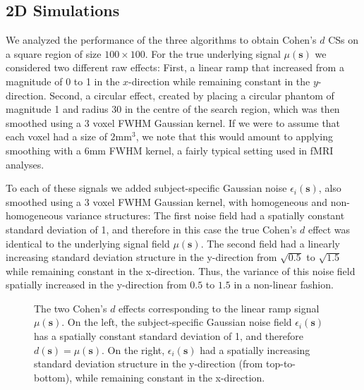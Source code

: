 \subsection{2D Simulations}
\label{sec:cohen_2D_simulations}
We analyzed the performance of the three algorithms to obtain Cohen's $d$ CSs on a square region of size $100 \times 100$. For the true underlying signal $\mu(\bm{s})$ we considered two different raw effects: First, a linear ramp that increased from a magnitude of 0 to 1 in the $x$-direction while remaining constant in the $y$-direction. Second, a circular effect, created by placing a circular phantom of magnitude 1 and radius 30 in the centre of the search region, which was then smoothed using a 3 voxel FWHM Gaussian kernel. If we were to assume that each voxel had a size of $2$mm$^{3}$, we note that this would amount to applying smoothing with a $6$mm FWHM kernel, a fairly typical setting used in fMRI analyses.

To each of these signals we added subject-specific Gaussian noise $\epsilon_{i}(\bm{s})$, also smoothed using a 3 voxel FWHM Gaussian kernel, with homogeneous and non-homogeneous variance structures: The first noise field had a spatially constant standard deviation of 1, and therefore in this case the true Cohen's $d$ effect was identical to the underlying signal field $\mu(\bm{s})$. The second field had a linearly increasing standard deviation structure in the y-direction from $\sqrt{0.5}$ to $\sqrt{1.5}$ while remaining constant in the x-direction. Thus, the variance of this noise field spatially increased in the y-direction from $0.5$ to $1.5$ in a non-linear fashion. 

\begin{figure}[htbp]
  \centering
  \hspace{1em}
  \caption{The two Cohen's $d$ effects corresponding to the linear ramp signal $\mu(\bm{s})$. On the left, the subject-specific Gaussian noise field $\epsilon_{i}(\bm{s})$ has a spatially constant standard deviation of 1, and therefore $d(\bm{s}) = \mu(\bm{s})$. On the right, $\epsilon_{i}(\bm{s})$ had a spatially increasing standard deviation structure in the y-direction (from top-to-bottom), while remaining constant in the x-direction.} 
\label{fig:linear_ramp_figures}
\end{figure}

